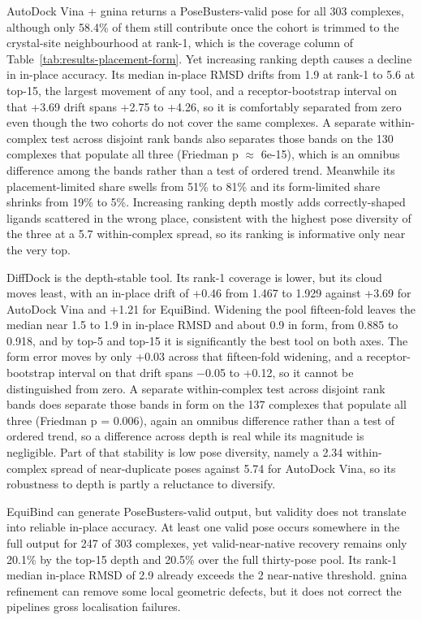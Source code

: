 AutoDock Vina + gnina returns a PoseBusters-valid pose for all 303 complexes, although only 58.4\% of them still contribute once the cohort is trimmed to the crystal-site neighbourhood at rank-1, which is the coverage column of Table~\ref{tab:results-placement-form}. Yet increasing ranking depth causes a decline in in-place accuracy. Its median in-place RMSD drifts from 1.9\angstrom{} at rank-1 to 5.6\angstrom{} at top-15, the largest movement of any tool, and a receptor-bootstrap interval on that +3.69\angstrom{} drift spans +2.75 to +4.26\angstrom{}, so it is comfortably separated from zero even though the two cohorts do not cover the same complexes. A separate within-complex test across disjoint rank bands also separates those bands on the 130 complexes that populate all three (Friedman p \ensuremath{\approx} 6e-15), which is an omnibus difference among the bands rather than a test of ordered trend. Meanwhile its placement-limited share swells from 51\% to 81\% and its form-limited share shrinks from 19\% to 5\%. Increasing ranking depth mostly adds correctly-shaped ligands scattered in the wrong place, consistent with the highest pose diversity of the three at a 5.7\angstrom{} within-complex spread, so its ranking is informative only near the very top.

DiffDock is the depth-stable tool. Its rank-1 coverage is lower, but its cloud moves least, with an in-place drift of +0.46\angstrom{} from 1.467 to 1.929\angstrom{} against +3.69\angstrom{} for AutoDock Vina and +1.21\angstrom{} for EquiBind. Widening the pool fifteen-fold leaves the median near 1.5 to 1.9\angstrom{} in in-place RMSD and about 0.9\angstrom{} in form, from 0.885 to 0.918\angstrom{}, and by top-5 and top-15 it is significantly the best tool on both axes. The form error moves by only +0.03\angstrom{} across that fifteen-fold widening, and a receptor-bootstrap interval on that drift spans \ensuremath{-}0.05 to +0.12\angstrom{}, so it cannot be distinguished from zero. A separate within-complex test across disjoint rank bands does separate those bands in form on the 137 complexes that populate all three (Friedman p = 0.006), again an omnibus difference rather than a test of ordered trend, so a difference across depth is real while its magnitude is negligible. Part of that stability is low pose diversity, namely a 2.34\angstrom{} within-complex spread of near-duplicate poses against 5.74\angstrom{} for AutoDock Vina, so its robustness to depth is partly a reluctance to diversify.

EquiBind can generate PoseBusters-valid output, but validity does not translate into reliable in-place accuracy. At least one valid pose occurs somewhere in the full output for 247 of 303 complexes, yet valid-near-native recovery remains only 20.1\% by the top-15 depth and 20.5\% over the full thirty-pose pool. Its rank-1 median in-place RMSD of 2.9 \angstrom{} already exceeds the 2 \angstrom{} near-native threshold. gnina refinement can remove some local geometric defects, but it does not correct the pipeline\textquotesingle s gross localisation failures.

